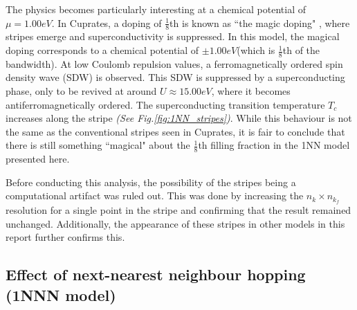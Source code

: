 \documentclass[11pt]{article}
\begin{document}
\noindent The physics becomes particularly interesting at a chemical potential of $\mu =1.00eV$. 
In Cuprates, a doping of $\frac{1}{8}$th is known as ``the magic doping" \cite{komiya2005magic}, where
stripes emerge and superconductivity is suppressed. In this model, the magical doping corresponds 
to a chemical potential of $\pm 1.00eV$(which is $\frac{1}{8}$th of the bandwidth). 
At low Coulomb repulsion values, a ferromagnetically ordered spin density wave (SDW) is observed. This SDW is suppressed by a superconducting phase,
only to be revived at around $U \approx 15.00eV$, where it becomes antiferromagnetically ordered. The superconducting transition temperature $T_c$ increases along the stripe \textit{(See Fig.\ref{fig:1NN_stripes})}.
While this behaviour is not the same as the conventional stripes seen in Cuprates, it is fair to conclude that there is still something 
``magical" about the $\frac{1}{8}$th filling fraction in the 1NN model presented here. \par
\medskip

\noindent Before conducting this analysis, the possibility of the stripes being a computational artifact was ruled out.
This was done by increasing the $n_k \times n_{k_f}$ resolution for a single point in the stripe and
confirming that the result remained unchanged. Additionally, the appearance of these stripes in other models in this report further confirms this.


\subsection{Effect of next-nearest neighbour hopping (1NNN model)}
\label{subsec:1NNNModel}
\end{document}
